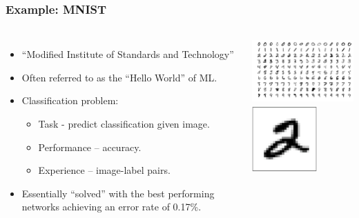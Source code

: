 \documentclass{beamer}
\begin{document}
\begin{frame}

    \frametitle{Example: MNIST}

    \begin{columns}

        
        \begin{itemize}
            \item “Modified Institute of Standards and Technology”
            \item Often referred to as the “Hello World” of ML.
            \item Classification problem:
                \begin{itemize}
                    \item Task - predict classification given image.
                    \item Performance – accuracy.
                    \item Experience – image-label pairs.
                \end{itemize}
            \item Essentially ``solved'' with the best performing networks achieving  an error rate of 0.17\%.
        \end{itemize}

            \begin{center}
                \includegraphics[height=2.5cm]{figs/mnist_examples.png}
                \includegraphics[height=2.5cm]{figs/mnist_example.png}    
            \end{center}
    \end{columns}
\end{frame}
\end{document}
